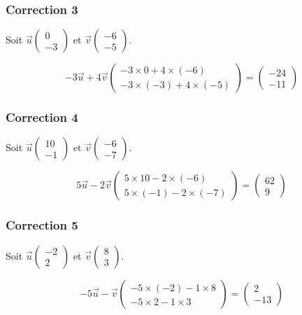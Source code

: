 \documentclass[15pt, mathserif]{beamer}
\begin{document}
\begin{frame}
\vspace{-10mm}
	\frametitle{Correction 3}
Soit $\vec{u} \begin{pmatrix} 0 \\ -3 \end{pmatrix}$ et $\vec{v} \begin{pmatrix} -6 \\ -5 \end{pmatrix}$. 
 
 $$-3\vec{u}+4\vec{v}\begin{pmatrix} -3 \times 0+4 \times \left(-6\right)\\  -3 \times \left(-3\right)+4 \times \left(-5\right)\end{pmatrix}=\begin{pmatrix}-24 \\ -11\end{pmatrix}$$\end{frame}


\begin{frame}
\vspace{-10mm}
	\frametitle{Correction 4}
Soit $\vec{u} \begin{pmatrix} 10 \\ -1 \end{pmatrix}$ et $\vec{v} \begin{pmatrix} -6 \\ -7 \end{pmatrix}$. 
 
 $$5\vec{u}-2\vec{v}\begin{pmatrix} 5 \times 10-2 \times \left(-6\right)\\  5 \times \left(-1\right)-2 \times \left(-7\right)\end{pmatrix}=\begin{pmatrix}62 \\ 9\end{pmatrix}$$\end{frame}


\begin{frame}
\vspace{-10mm}
	\frametitle{Correction 5}
Soit $\vec{u} \begin{pmatrix} -2 \\ 2 \end{pmatrix}$ et $\vec{v} \begin{pmatrix} 8 \\ 3 \end{pmatrix}$. 
 
 $$-5\vec{u}-\vec{v}\begin{pmatrix} -5 \times \left(-2\right)-1 \times 8\\  -5 \times 2-1 \times 3\end{pmatrix}=\begin{pmatrix}2 \\ -13\end{pmatrix}$$\end{frame}
\end{document}
